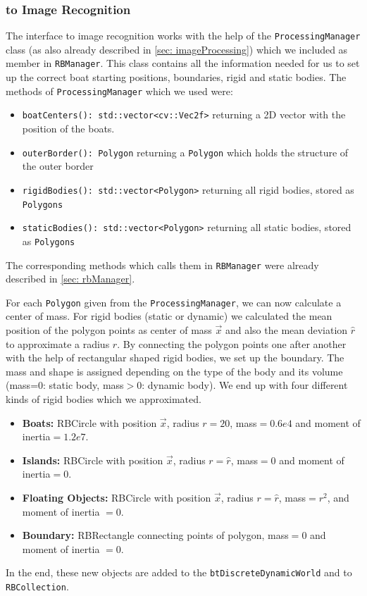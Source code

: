 \subsubsection{to Image Recognition}
\label{sec: interfaceImageRecognition}
The interface to image recognition works with the help of the \texttt{ProcessingManager} class (as also already described in \autoref{sec: imageProcessing}) which we included as member in \texttt{RBManager}. This class contains all the information needed for us to set up the correct boat starting positions, boundaries, rigid and static bodies. The methods of \texttt{ProcessingManager} which we used were:
\begin{itemize}
\item \texttt{boatCenters(): std::vector<cv::Vec2f>} returning a 2D vector with the position of the boats.
\item \texttt{outerBorder(): Polygon} returning a \texttt{Polygon} which holds the structure of the outer border
\item \texttt{rigidBodies(): std::vector<Polygon>} returning all rigid bodies, stored as \texttt{Polygons}
\item \texttt{staticBodies(): std::vector<Polygon>} returning all static bodies, stored as \texttt{Polygons}
\end{itemize} 
The corresponding methods which calls them in \texttt{RBManager} were already described in \autoref{sec: rbManager}.


For each \texttt{Polygon} given from the \texttt{ProcessingManager}, we can now calculate a center of mass. For rigid bodies (static or dynamic) we calculated the mean position of the polygon points as center of mass $\overrightarrow{x}$ and also the mean deviation $\hat{r}$ to approximate a radius $r$. By connecting the polygon points one after another with the help of rectangular shaped rigid bodies, we set up the boundary. The mass and shape is assigned depending on the type of the body and its volume (mass=0: static body, mass$>$0: dynamic body). We end up with four different kinds of rigid bodies which we approximated.
\begin{itemize}
\item \textbf{Boats:} RBCircle with position $\overrightarrow{x}$, radius $r=20$, mass$=0.6e4$ and moment of inertia$=1.2e7$.
\item \textbf{Islands:} RBCircle with position $\overrightarrow{x}$, radius $r=\hat{r}$, mass$=0$ and moment of inertia$=0$.
\item \textbf{Floating Objects:} RBCircle with position $\overrightarrow{x}$, radius $r=\hat{r}$, mass$=r^2$, and moment of inertia $=0$.
\item \textbf{Boundary:} RBRectangle connecting points of polygon, mass$=0$ and moment of inertia $=0$.
\end{itemize}
In the end, these new objects are added to the \texttt{btDiscreteDynamicWorld} and to \texttt{RBCollection}.


